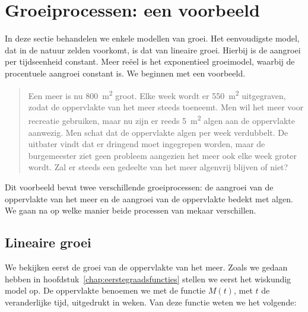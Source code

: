 \newpage
\section{Groeiprocessen: een voorbeeld}
In deze sectie behandelen we enkele modellen van groei. Het eenvoudigste model, dat in de natuur zelden voorkomt, is dat van lineaire groei. Hierbij is de aangroei per tijdseenheid constant. Meer re\"eel is het exponentieel groeimodel, waarbij de procentuele aangroei constant is. We beginnen met een voorbeeld.

\label{page:meeralgen}
\begin{quote}
    Een meer is nu \SI{800}{\square\meter} groot. Elke week wordt er \SI{550}{\square\meter} uitgegraven, zodat de oppervlakte van het meer steeds
toeneemt. Men wil het meer voor recreatie gebruiken, maar nu zijn
er reeds \SI{5}{\square\meter} algen aan de oppervlakte aanwezig. Men schat
dat de oppervlakte algen per week verdubbelt. De uitbater vindt
dat er dringend moet ingegrepen worden, maar de burgemeester ziet
geen probleem aangezien het meer ook elke week groter wordt.
Zal er steeds een gedeelte van het meer algenvrij blijven of niet?
\end{quote}
Dit voorbeeld bevat twee verschillende groeiprocessen: de aangroei van de
oppervlakte van het meer en de aangroei van de oppervlakte bedekt met algen.
We gaan na op welke manier beide processen van mekaar verschillen.

\subsection{Lineaire groei}
 We bekijken eerst de groei van de oppervlakte van het meer. Zoals we gedaan hebben in hoofdstuk~\ref{chap:eerstegraadsfuncties} stellen we eerst het wiskundig model op. 
 De oppervlakte benoemen we met de
functie $M(t)$, met $t$ de veranderlijke tijd, uitgedrukt in weken.
Van deze functie weten we het volgende:

